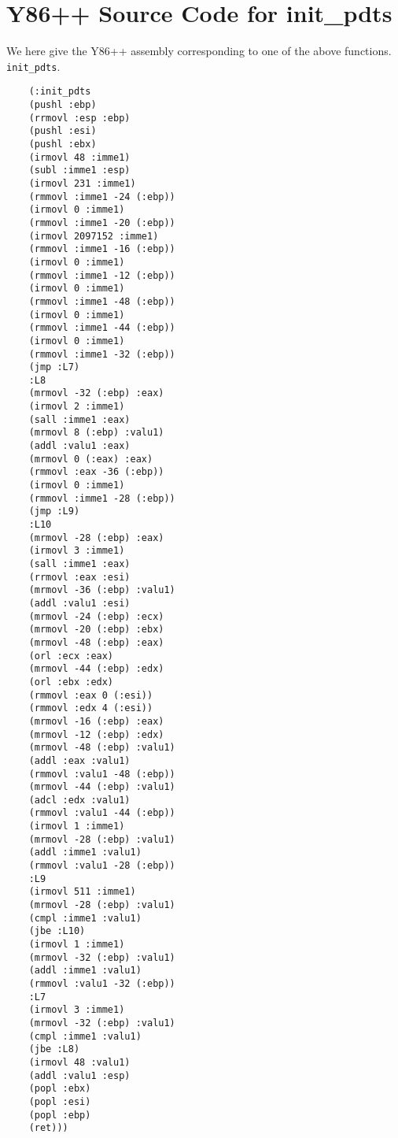 \documentclass[submission,copyright]{eptcs} \providecommand{\event}{ACL2 2011}
\begin{document}
\section{Y86++ Source Code for init\_pdts}

We here give the Y86++ assembly corresponding to one of the above
functions. \texttt{init\_pdts}.

\begin{verbatim}
    (:init_pdts
    (pushl :ebp)
    (rrmovl :esp :ebp)
    (pushl :esi)
    (pushl :ebx)
    (irmovl 48 :imme1)
    (subl :imme1 :esp)
    (irmovl 231 :imme1)
    (rmmovl :imme1 -24 (:ebp))
    (irmovl 0 :imme1)
    (rmmovl :imme1 -20 (:ebp))
    (irmovl 2097152 :imme1)
    (rmmovl :imme1 -16 (:ebp))
    (irmovl 0 :imme1)
    (rmmovl :imme1 -12 (:ebp))
    (irmovl 0 :imme1)
    (rmmovl :imme1 -48 (:ebp))
    (irmovl 0 :imme1)
    (rmmovl :imme1 -44 (:ebp))
    (irmovl 0 :imme1)
    (rmmovl :imme1 -32 (:ebp))
    (jmp :L7)
    :L8
    (mrmovl -32 (:ebp) :eax)
    (irmovl 2 :imme1)
    (sall :imme1 :eax)
    (mrmovl 8 (:ebp) :valu1)
    (addl :valu1 :eax)
    (mrmovl 0 (:eax) :eax)
    (rmmovl :eax -36 (:ebp))
    (irmovl 0 :imme1)
    (rmmovl :imme1 -28 (:ebp))
    (jmp :L9)
    :L10
    (mrmovl -28 (:ebp) :eax)
    (irmovl 3 :imme1)
    (sall :imme1 :eax)
    (rrmovl :eax :esi)
    (mrmovl -36 (:ebp) :valu1)
    (addl :valu1 :esi)
    (mrmovl -24 (:ebp) :ecx)
    (mrmovl -20 (:ebp) :ebx)
    (mrmovl -48 (:ebp) :eax)
    (orl :ecx :eax)
    (mrmovl -44 (:ebp) :edx)
    (orl :ebx :edx)
    (rmmovl :eax 0 (:esi))
    (rmmovl :edx 4 (:esi))
    (mrmovl -16 (:ebp) :eax)
    (mrmovl -12 (:ebp) :edx)
    (mrmovl -48 (:ebp) :valu1)
    (addl :eax :valu1)
    (rmmovl :valu1 -48 (:ebp))
    (mrmovl -44 (:ebp) :valu1)
    (adcl :edx :valu1)
    (rmmovl :valu1 -44 (:ebp))
    (irmovl 1 :imme1)
    (mrmovl -28 (:ebp) :valu1)
    (addl :imme1 :valu1)
    (rmmovl :valu1 -28 (:ebp))
    :L9
    (irmovl 511 :imme1)
    (mrmovl -28 (:ebp) :valu1)
    (cmpl :imme1 :valu1)
    (jbe :L10)
    (irmovl 1 :imme1)
    (mrmovl -32 (:ebp) :valu1)
    (addl :imme1 :valu1)
    (rmmovl :valu1 -32 (:ebp))
    :L7
    (irmovl 3 :imme1)
    (mrmovl -32 (:ebp) :valu1)
    (cmpl :imme1 :valu1)
    (jbe :L8)
    (irmovl 48 :valu1)
    (addl :valu1 :esp)
    (popl :ebx)
    (popl :esi)
    (popl :ebp)
    (ret)))
\end{verbatim}

  
\end{document}
